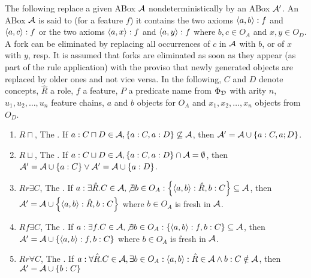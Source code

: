 \begin{defi}
The following  replace a given ABox $\mathcal{A}$ nondeterministically by an ABox $\mathcal{A}'$. An ABox $\mathcal{A}$ is said to  (for a feature $f$) \iffTx{} it contains the two axioms $\left\langle a,b\right\rangle:f$ and $\left\langle a,c\right\rangle:f$ or the two axioms $\left\langle a,x\right\rangle:f$ and $\left\langle a,y\right\rangle:f$ where $b,c\in O_A$ and $x,y\in O_D$. A fork can be eliminated by replacing all occurrences of $c$ in $\mathcal{A}$ with $b$, or of $x$ with $y$, resp. It is assumed that forks are eliminated as soon as they appear (as part of the rule application) with the proviso that newly generated objects are replaced by older ones and not vice versa. In the following, $C$ and $D$ denote concepts, $\hat{R}$ a role, $f$ a feature, $P$ a predicate name from $\Phi_{\mathcal{D}}$ with arity $n$, $u_1,u_2,\ldots,u_n$ feature chains, $a$ and $b$ objects for $O_A$ and $x_1,x_2,\ldots,x_n$ objects from $O_D$.
\begin{enumerate}
 \item $R\sqcap$, The . If $a:C\sqcap D\in\mathcal{A},\left\{ a:C,a:D\right\}\not\subseteq\mathcal{A}$, then $\mathcal{A}'=\mathcal{A}\cup\left\{ a:C,a;D\right\}$.
 \item $R\sqcup$, The . If $a:C\sqcup D\in\mathcal{A},\left\{ a:C,a:D\right\}\cap\mathcal{A}=\emptyset$, then $\mathcal{A}'=\mathcal{A}\cup\left\{ a:C\right\}\vee\mathcal{A}'=\mathcal{A}\cup\left\{ a:D\right\}$.
 \item $Rr\exists C$, The . If $a:\exists\hat{R}.C\in\mathcal{A},\not\exists b\in O_A:\left\{ \left\langle a,b\right\rangle:\hat{R},b:C\right\}\subseteq\mathcal{A}$, then $\mathcal{A}'=\mathcal{A}\cup\left\{ \left\langle a,b\right\rangle:\hat{R},b:C\right\}$ where $b\in O_A$ is fresh in $\mathcal{A}$.
 \item $Rf\exists C$, The . If $a:\exists f.C\in\mathcal{A},\not\exists b\in O_A:\left\{ \left\langle a,b\right\rangle:f,b:C\right\}\subseteq\mathcal{A}$, then $\mathcal{A}'=\mathcal{A}\cup\left\{ \left\langle a,b\right\rangle:f,b:C\right\}$ where $b\in O_A$ is fresh in $\mathcal{A}$.
 \item $Rr\forall C$, The . If $a:\forall\hat{R}.C\in\mathcal{A},\exists b\in O_A:\left\langle a,b\right\rangle:\hat{R}\in\mathcal{A}\wedge b:C\notin\mathcal{A}$, then $\mathcal{A}'=\mathcal{A}\cup\left\{ b:C\right\}$

\end{enumerate}
\end{defi}
